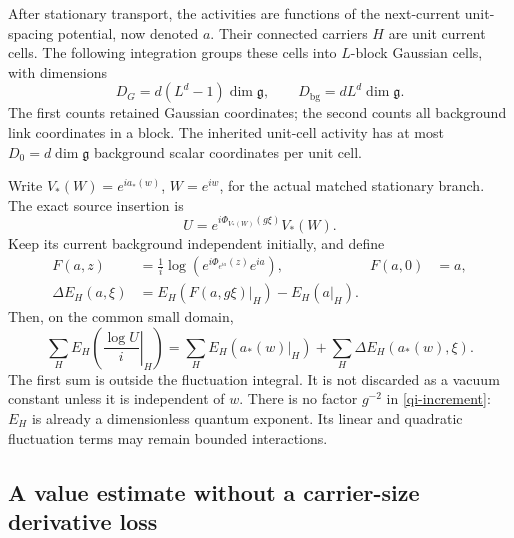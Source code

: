 \documentclass[11pt]{article}
\theoremstyle{remark}
\begin{document}
After stationary transport, the activities are functions of the
next-current unit-spacing potential, now denoted $a$. Their
connected carriers $H$ are unit current cells. The following
integration groups these cells into $L$-block Gaussian cells,
with dimensions
\begin{equation}\label{qi-dimensions}
 D_G=d(L^d-1)\dim\mathfrak g,\qquad
 D_{\mathrm{bg}}=dL^d\dim\mathfrak g.
\end{equation}
The first counts retained Gaussian coordinates; the second counts
all background link coordinates in a block. The inherited unit-cell
activity has at most $D_0=d\dim\mathfrak g$ background scalar
coordinates per unit cell.

Write $V_*(W)=e^{ia_*(w)}$, $W=e^{iw}$, for the actual matched
stationary branch. The exact source insertion is
\begin{equation}\label{qi-actual-insertion}
 U=e^{i\Phi_{V_*(W)}(g\xi)}V_*(W).
\end{equation}
Keep its current background independent initially, and define
\begin{align}
 F(a,z)&=\frac1i\log\left(e^{i\Phi_{e^{ia}}(z)}e^{ia}\right),
 &F(a,0)&=a,                                            \label{qi-map}\\
 \Delta E_H(a,\xi)&=E_H(F(a,g\xi)|_H)-E_H(a|_H).         \label{qi-increment}
\end{align}
Then, on the common small domain,
\begin{equation}\label{qi-exact-split}
 \sum_H E_H\left(\left.\frac{\log U}{i}\right|_H\right)
 =\sum_H E_H(a_*(w)|_H)
       +\sum_H\Delta E_H(a_*(w),\xi).
\end{equation}
The first sum is outside the fluctuation integral. It is not
discarded as a vacuum constant unless it is independent of $w$.
There is no factor $g^{-2}$ in \eqref{qi-increment}: $E_H$ is
already a dimensionless quantum exponent. Its linear and
quadratic fluctuation terms may remain bounded interactions.

\subsection{A value estimate without a carrier-size derivative loss}
\end{document}
